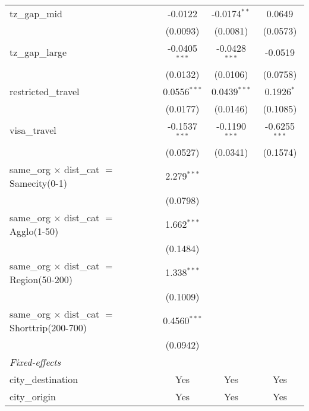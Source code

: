 \begin{tabular}{lccc}
   tz\_gap\_mid                                           & -0.0122         & -0.0174$^{**}$  & 0.0649\\   
                                                          & (0.0093)        & (0.0081)        & (0.0573)\\   
   tz\_gap\_large                                         & -0.0405$^{***}$ & -0.0428$^{***}$ & -0.0519\\   
                                                          & (0.0132)        & (0.0106)        & (0.0758)\\   
   restricted\_travel                                     & 0.0556$^{***}$  & 0.0439$^{***}$  & 0.1926$^{*}$\\   
                                                          & (0.0177)        & (0.0146)        & (0.1085)\\   
   visa\_travel                                           & -0.1537$^{***}$ & -0.1190$^{***}$ & -0.6255$^{***}$\\   
                                                          & (0.0527)        & (0.0341)        & (0.1574)\\   
   same\_org $\times$ dist\_cat $=$ Samecity(0-1)         & 2.279$^{***}$   &                 &   \\   
                                                          & (0.0798)        &                 &   \\   
   same\_org $\times$ dist\_cat $=$ Agglo(1-50)           & 1.662$^{***}$   &                 &   \\   
                                                          & (0.1484)        &                 &   \\   
   same\_org $\times$ dist\_cat $=$ Region(50-200)        & 1.338$^{***}$   &                 &   \\   
                                                          & (0.1009)        &                 &   \\   
   same\_org $\times$ dist\_cat $=$ Shorttrip(200-700)    & 0.4560$^{***}$  &                 &   \\   
                                                          & (0.0942)        &                 &   \\   
   \midrule
   \emph{Fixed-effects}\\
   city\_destination                                      & Yes             & Yes             & Yes\\  
   city\_origin                                           & Yes             & Yes             & Yes\\  

\end{tabular}
